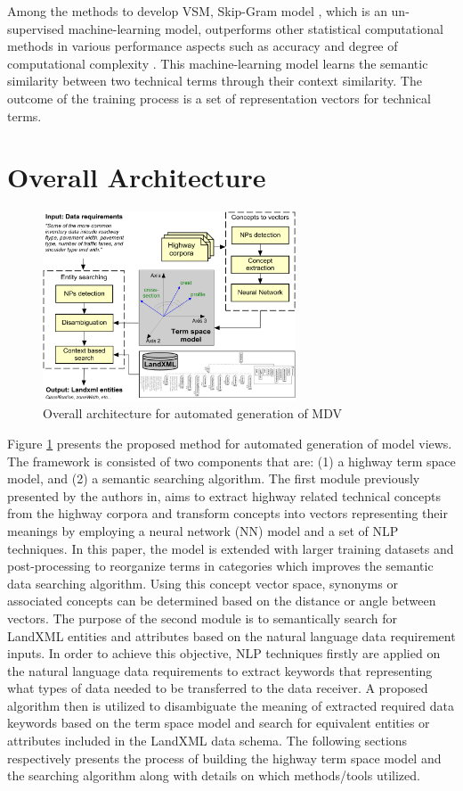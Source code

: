 \documentclass[Journal, InsideFigs, DoubleSpace]{ascelike} %
\begin{document}
\par
Among the methods to develop VSM, Skip-Gram model \cite{mikolov13a}, which is an un-supervised machine-learning model, outperforms other statistical computational methods in various performance aspects such as accuracy and degree of computational complexity \cite{mikolov13a}. This machine-learning model learns the semantic similarity between two technical terms through their context similarity. The outcome of the training process is a set of representation vectors for technical terms. 
%
\section{Overall Architecture} \label{sec:proposed_method} %
%
\begin{figure}[t]
\centering
\includegraphics[width=0.67\textwidth]{framework3}
\caption{Overall architecture for automated generation of MDV}
\label{fig:framework}
\end{figure}
%
Figure \ref{fig:framework} presents the proposed method for automated generation of model views. The framework is consisted of two components that are: (1) a highway term space model, and (2) a semantic searching algorithm. The first module previously presented by the authors in, aims to extract highway related technical concepts from the highway corpora and transform concepts into vectors representing their meanings by employing a neural network (NN) model and a set of NLP techniques. In this paper, the model is extended with larger training datasets and post-processing to reorganize terms in categories which improves the semantic data searching algorithm. Using this concept vector space, synonyms or associated concepts can be determined based on the distance or angle between vectors. The purpose of the second module is to semantically search for LandXML entities and attributes based on the natural language data requirement inputs. In order to achieve this objective, NLP techniques firstly are applied on the natural language data requirements to extract keywords that representing what types of data needed to be transferred to the data receiver. A proposed algorithm then is utilized to disambiguate the meaning of extracted required data keywords based on the term space model and search for equivalent entities or attributes included in the LandXML data schema. The following sections respectively presents the process of building the highway term space model and the searching algorithm along with details on which methods/tools utilized. 
%
\end{document}
